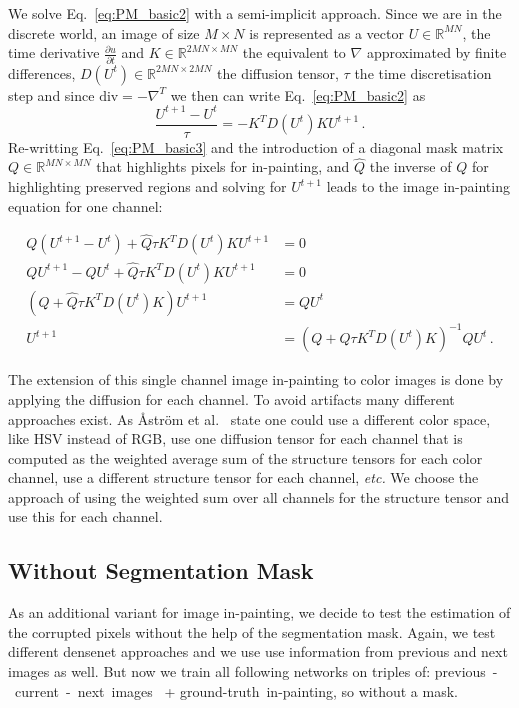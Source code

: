 We solve Eq.~\eqref{eq:PM_basic2} with a semi-implicit approach. Since we are in the discrete world, an image of size $M \times N$ is represented as a vector $U \in \mathbb{R}^{MN}$, the time derivative $\frac{\partial u}{\partial t}$ and $K \in \mathbb{R}^{2MN\times MN}$ the equivalent to $\nabla$ approximated by finite differences, $D(U^t) \in \mathbb{R}^{2MN\times2MN}$ the diffusion tensor, $\tau$ the time discretisation step and since $\text{div} = -\nabla^T$ we then can write Eq.~\eqref{eq:PM_basic2} as
\begin{equation}
\frac{U^{t+1}-U^t}{\tau}=-K^TD(U^t)KU^{t+1}\,.
\label{eq:PM_basic3}
\end{equation}
Re-writting Eq.~\eqref{eq:PM_basic3} and the introduction of a diagonal mask matrix $Q \in \mathbb{R}^{MN \times MN}$ that highlights pixels for in-painting, and $ \hat{Q}$ the inverse of $Q$ for highlighting preserved regions and solving for $U^{t+1}$ leads to the image in-painting equation for one channel:

\begin{equation} \label{eq:PM_final}
\begin{split}
Q(U^{t+1}-U^t)+\hat{Q}\tau K^TD(U^t)K U^{t+1} &= 0 \\
Q U^{t+1}-Q U^t+\hat{Q}\tau K^TD(U^t)K U^{t+1} &= 0 \\
 (Q+\hat{Q} \tau K^TD(U^t)K) U^{t+1} &= Q U^t\\
  U^{t+1} &= (Q+\hat{Q}\tau K^TD(U^t)K)^{-1}QU^t\,.
\end{split}
\end{equation}


The extension of this single channel image in-painting to color images is done by applying the diffusion for each channel. To avoid artifacts many different approaches exist. As {\AA}str{\"o}m et al.~\cite{aastrom11} state one could use a different color space, like HSV instead of RGB, use one diffusion tensor for each channel that is computed as the weighted average sum of the structure tensors for each color channel, use a different structure tensor for each channel, \textit{etc.} We choose the approach of using the weighted sum over all channels for the structure tensor and use this for each channel.

\subsection{Without Segmentation Mask}
\label{ssec:num42}

As an additional variant for image in-painting, we decide to test the estimation of the corrupted pixels without the help of the segmentation mask. Again, we test different densenet approaches and we use use information from previous and next images as well. But now we train all following networks on triples of: previous~-~current~-~next~images~ + ground-truth~in-painting, so without a mask.


